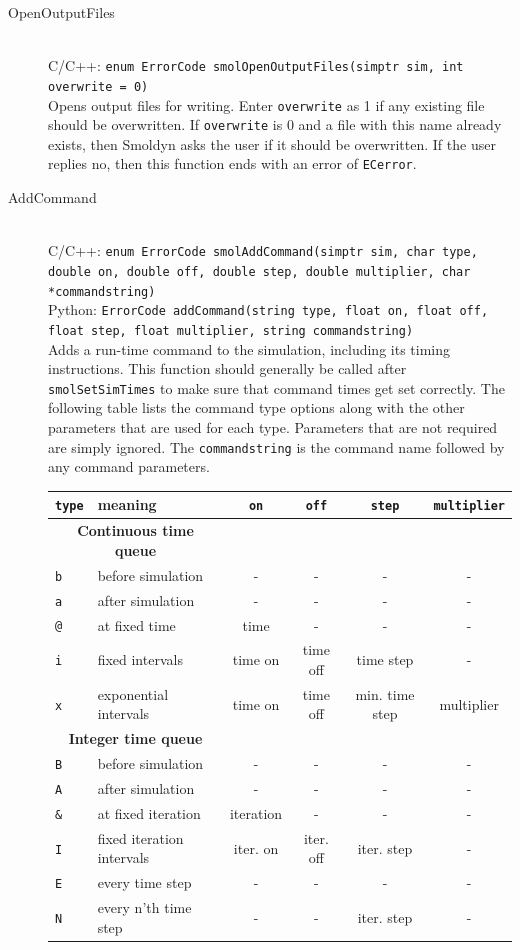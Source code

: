 \documentclass {scrbook}
\newcommand {\ttt} {\texttt}
\begin{document}
\begin{description}
\item[OpenOutputFiles]
\hfill \\
C/C++: \ttt{enum ErrorCode smolOpenOutputFiles(simptr sim, int overwrite = 0)}\\
Opens output files for writing. Enter \ttt{overwrite} as 1 if any existing file should be overwritten. If \ttt{overwrite} is 0 and a file with this name already exists, then Smoldyn asks the user if it should be overwritten. If the user replies no, then this function ends with an error of \ttt{ECerror}.

\item[AddCommand]
\hfill \\
C/C++: \ttt{enum ErrorCode smolAddCommand(simptr sim, char type, double on, double off, double step, double multiplier, char *commandstring)}\\
Python: \ttt{ErrorCode addCommand(string type, float on, float off, float step, float multiplier, string commandstring)}\\
Adds a run-time command to the simulation, including its timing instructions. This function should generally be called after \ttt{smolSetSimTimes} to make sure that command times get set correctly. The following table lists the command type options along with the other parameters that are used for each type. Parameters that are not required are simply ignored. The \ttt{commandstring} is the command name followed by any command parameters.

\begin{longtable}[c]{ll|cccc}
\ttt{type} & meaning & \ttt{on} & \ttt{off} & \ttt{step} & \ttt{multiplier}\\
\hline
\multicolumn{2}{c}{\textbf{Continuous time queue}}\\
\ttt{b} & before simulation & - & - & - & -\\
\ttt{a} & after simulation & - & - & - & -\\
\ttt{@} & at fixed time & time & - & - & -\\
\ttt{i} & fixed intervals & time on & time off & time step & -\\
\ttt{x} & exponential intervals & time on & time off & min. time step & multiplier\\
\hline
\multicolumn{2}{c}{\textbf{Integer time queue}}\\
\ttt{B} & before simulation & - & - & - & -\\
\ttt{A} & after simulation & - & - & - & -\\
\ttt{\&} & at fixed iteration & iteration & - & - & -\\
\ttt{I} & fixed iteration intervals & iter. on & iter. off & iter. step & -\\
\ttt{E} & every time step & - & - & - & -\\
\ttt{N} & every n'th time step & - & - & iter. step & -\\
\end{longtable}


\end{description}
\end{document}
